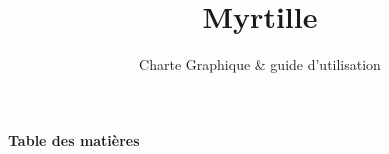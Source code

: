 \documentclass{Myrtille}
\title{Myrtille}
\subtitle{Charte Graphique \& guide d'utilisation}
\begin{document}

\makecover

{\sffamily\Large\bfseries\color{dark} Table des matières}
\vspace{4pt}\hrulefull
\tableofcontents

\newpage


\end{document}
